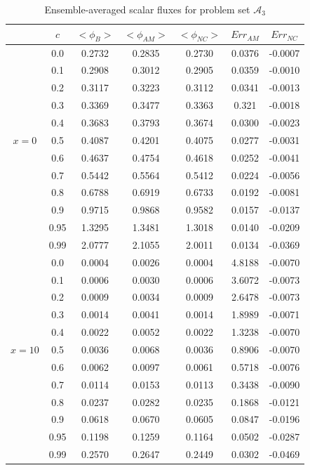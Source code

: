 \documentclass[12pt]{article}
\newcommand{\bl}{\big<}
\newcommand{\bg}{\big>}
\newcommand{\seta}{\mathcal{A}}
\begin{document}
{\begin{table}[p]
\centering
\caption{Ensemble-averaged scalar fluxes for problem set $\seta_3$}
\label{tab4} 
\begin{tabular}{||c|c||c|c|c||c|c||} \hline \hline
  & $c$ & $\bl\phi_B\bg$ & $\bl\phi_{AM}\bg$ &$\bl\phi_{NC}\bg$ & $Err_{AM}$ & $ Err_{NC}$\\ \hline\hline
& 0.0 & 0.2732 & 0.2835 & 0.2730 & 0.0376 & -0.0007 \\
\cline{2-7}
& 0.1 & 0.2908 & 0.3012 & 0.2905 & 0.0359 & -0.0010 \\
\cline{2-7}
& 0.2 & 0.3117 & 0.3223 & 0.3112 & 0.0341 & -0.0013  \\
\cline{2-7}
& 0.3 & 0.3369 & 0.3477 & 0.3363 & 0.321 & -0.0018 \\
\cline{2-7}
& 0.4 & 0.3683 & 0.3793 & 0.3674 & 0.0300 & -0.0023 \\
\cline{2-7}
$x=0$ & 0.5 & 0.4087 & 0.4201 & 0.4075 & 0.0277 & -0.0031 \\
\cline{2-7}
& 0.6 & 0.4637 & 0.4754 & 0.4618 & 0.0252 & -0.0041 \\
\cline{2-7}
& 0.7 & 0.5442 & 0.5564 & 0.5412 & 0.0224 & -0.0056 \\
\cline{2-7}
& 0.8 & 0.6788 & 0.6919 & 0.6733 & 0.0192 & -0.0081\\
\cline{2-7}
& 0.9 & 0.9715 & 0.9868 & 0.9582 & 0.0157 & -0.0137 \\
\cline{2-7}
& 0.95 & 1.3295 & 1.3481 & 1.3018 & 0.0140 & -0.0209 \\
\cline{2-7}
& 0.99 & 2.0777 & 2.1055 & 2.0011 & 0.0134 & -0.0369 \\ 
\hline\hline
& 0.0 & 0.0004 & 0.0026 & 0.0004 & 4.8188 &  -0.0070 \\
\cline{2-7}
& 0.1 & 0.0006 & 0.0030 & 0.0006 & 3.6072 & -0.0073 \\
\cline{2-7}
& 0.2 & 0.0009 & 0.0034 & 0.0009 & 2.6478 & -0.0073 \\
\cline{2-7}
& 0.3 & 0.0014 & 0.0041 & 0.0014 & 1.8989 & -0.0071\\
\cline{2-7}
& 0.4 & 0.0022 & 0.0052 & 0.0022 & 1.3238 & -0.0070 \\
\cline{2-7}
$x=10$ & 0.5 & 0.0036 & 0.0068 & 0.0036 & 0.8906 & -0.0070 \\
\cline{2-7}
& 0.6 & 0.0062 & 0.0097 & 0.0061 & 0.5718 & -0.0076 \\
\cline{2-7}
& 0.7 & 0.0114 & 0.0153 & 0.0113 & 0.3438 & -0.0090 \\
\cline{2-7}
& 0.8 & 0.0237 & 0.0282 & 0.0235 & 0.1868 & -0.0121 \\
\cline{2-7}
& 0.9 & 0.0618 & 0.0670 & 0.0605 & 0.0847 & -0.0196 \\
\cline{2-7}
& 0.95 & 0.1198 & 0.1259 & 0.1164 & 0.0502 & -0.0287 \\
\cline{2-7}
& 0.99 & 0.2570 & 0.2647 & 0.2449 & 0.0302 & -0.0469 \\
\hline\hline
  \end{tabular}
\end{table}





}
\end{document}
